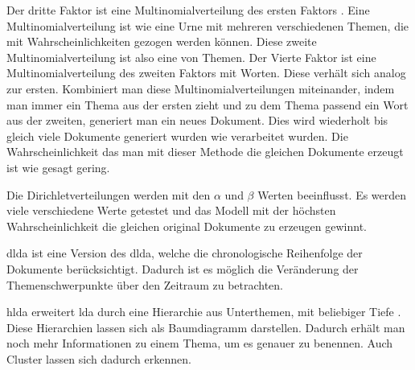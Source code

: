 Der dritte Faktor ist eine Multinomialverteilung des ersten Faktors \parencite[vgl.][S. 999-1002]{Blei03latentdirichlet}. Eine Multinomialverteilung ist wie eine Urne mit mehreren verschiedenen Themen, die mit Wahrscheinlichkeiten gezogen werden können. Diese zweite Multinomialverteilung ist also eine von Themen. Der Vierte Faktor ist eine Multinomialverteilung des zweiten Faktors mit Worten. Diese verhält sich analog zur ersten. Kombiniert man diese Multinomialverteilungen miteinander, indem man immer ein Thema aus der ersten zieht und zu dem Thema passend ein Wort aus der zweiten, generiert man ein neues Dokument. Dies wird wiederholt bis gleich viele Dokumente generiert wurden wie verarbeitet wurden. Die Wahrscheinlichkeit das man mit dieser Methode die gleichen Dokumente erzeugt ist wie gesagt gering.

Die Dirichletverteilungen werden mit den $\alpha$ und $\beta$ Werten beeinflusst. Es werden viele verschiedene Werte getestet und das Modell mit der höchsten Wahrscheinlichkeit die gleichen original Dokumente zu erzeugen gewinnt.

\gls{dlda} ist eine Version des \gls{dlda}, welche die chronologische Reihenfolge der Dokumente berücksichtigt. Dadurch ist es möglich die Veränderung der Themenschwerpunkte über den Zeitraum zu betrachten. \parencite[vgl.][]{dynamicLDA}

\gls{hlda} erweitert \gls{lda} durch eine Hierarchie aus Unterthemen, mit beliebiger Tiefe \parencite[vgl.][]{griffiths2004hierarchical}. Diese Hierarchien lassen sich als Baumdiagramm darstellen. Dadurch erhält man noch mehr Informationen zu einem Thema, um es genauer zu benennen. Auch Cluster lassen sich dadurch erkennen. 